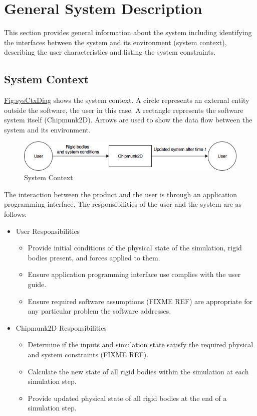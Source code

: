 \documentclass[12pt]{article}
\begin{document}
\section{General System Description}
\label{Sec:GenSysDesc}
This section provides general information about the system including identifying the interfaces between the system and its environment (system context), describing the user characteristics and listing the system constraints.
\subsection{System Context}
\label{Sec:SysContext}
\hyperref[Figure:sysCtxDiag]{Fig:sysCtxDiag} shows the system context. A circle represents an external entity outside the software, the user in this case. A rectangle represents the software system itself (Chipmunk2D). Arrows are used to show the data flow between the system and its environment.
\begin{figure}
\begin{center}
\includegraphics[width=\textwidth]{../../../datafiles/GamePhysics/sysctx.png}
\caption{System Context}
\label{Figure:sysCtxDiag}
\end{center}
\end{figure}
The interaction between the product and the user is through an application programming interface. The responsibilities of the user and the system are as follows:
\begin{itemize}
\item{User Responsibilities}
\begin{itemize}
\item{Provide initial conditions of the physical state of the simulation, rigid bodies present, and forces applied to them.}
\item{Ensure application programming interface use complies with the user guide.}
\item{Ensure required software assumptions (FIXME REF) are appropriate for any particular problem the software addresses.}
\end{itemize}
\item{Chipmunk2D Responsibilities}
\begin{itemize}
\item{Determine if the inputs and simulation state satisfy the required physical and system constraints (FIXME REF).}
\item{Calculate the new state of all rigid bodies within the simulation at each simulation step.}
\item{Provide updated physical state of all rigid bodies at the end of a simulation step.}
\end{itemize}
\end{itemize}
\end{document}
